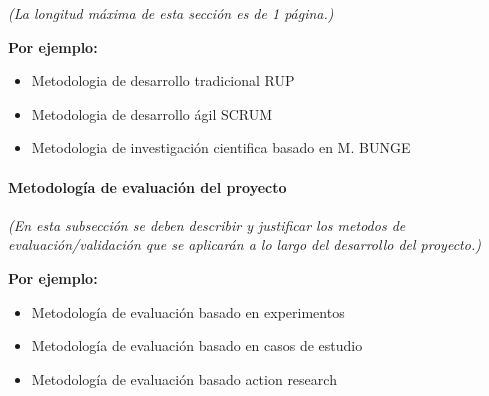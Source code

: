 \documentclass[11pt,letterpaper]{article}
\begin{document}
\emph{(La longitud máxima de esta sección es de 1 página.)}

\textbf{Por ejemplo:}
\begin{itemize}
	\item Metodologia de desarrollo tradicional RUP
	\item Metodologia de desarrollo ágil SCRUM
	\item Metodologia de investigación cientifica basado en M. BUNGE
\end{itemize}

\subsection{Metodología de evaluación del proyecto}
\emph{(En esta subsección se deben describir y justificar los metodos de evaluación/validación que se aplicarán a lo largo del desarrollo del proyecto.)}

\textbf{Por ejemplo:}
\begin{itemize}
	\item Metodología de evaluación basado en experimentos
	\item Metodología de evaluación basado en casos de estudio
		\item Metodología de evaluación basado action research
\end{itemize}

\part{%
%
}
\end{document}
